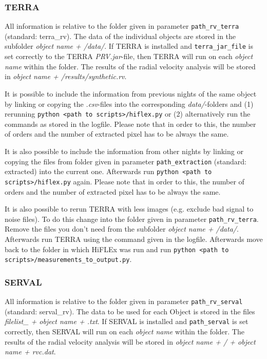 \documentclass[10pt,a4paper]{article}
\begin{document}
\subsubsection{TERRA}
\label{Section:files_folders_rv_for_terra}
All information is relative to the folder given in parameter \verb|path_rv_terra| (standard: terra\_rv). 
The data of the individual objects are stored in the subfolder \textit{object name + /data/}. If TERRA is installed and \verb|terra_jar_file| is set correctly to the TERRA \textit{PRV.jar}-file, then TERRA will run on each \textit{object name} within the folder. The results of the radial velocity analysis will be stored in \textit{object name + /results/synthetic.rv}.

It is possible to include the information from previous nights of the same object by linking or copying the \textit{.csv}-files into the corresponding \textit{data/}-folders and (1) rerunning \verb|python <path to scripts>/hiflex.py| or (2) alternatively run the commands as stored in the logfile. Please note that in order to this, the number of orders and the number of extracted pixel has to be always the same.

It is also possible to include the information from other nights by linking or copying the files from folder given in parameter \verb|path_extraction| (standard: extracted) into the current one. Afterwards run \verb|python <path to scripts>/hiflex.py| again. Please note that in order to this, the number of orders and the number of extracted pixel has to be always the same.

It is also possible to rerun TERRA with less images (e.g. exclude bad signal to noise files). To do this change into the folder given in parameter \verb|path_rv_terra|. Remove the files you don't need from the subfolder \textit{object name + /data/}. Afterwards run TERRA using the command given in the logfile. Afterwards move back to the folder in which HiFLEx was run and run \verb|python <path to scripts>/measurements_to_output.py|.

\subsubsection{SERVAL}
\label{Section:files_folders_rv_for_serval}
All information is relative to the folder given in parameter \verb|path_rv_serval| (standard: serval\_rv). 
The data to be used for each Object is stored in the files \textit{filelist\_ + object name + .txt}. If SERVAL is installed and \verb|path_serval| is set correctly, then SERVAL will run on each \textit{object name} within the folder. The results of the radial velocity analysis will be stored in \textit{object name + / + object name + rvc.dat}.
\end{document}
